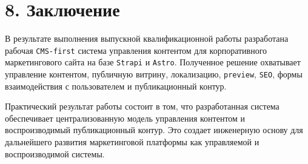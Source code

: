 \documentclass[12pt,a4paper]{article}
\begin{document}
\section*{8. Заключение}

В результате выполнения выпускной квалификационной работы разработана рабочая
\texttt{CMS-first} система управления контентом для корпоративного маркетингового сайта на
базе \texttt{Strapi} и \texttt{Astro}. Полученное решение охватывает управление контентом,
публичную витрину, локализацию, \texttt{preview}, \texttt{SEO}, формы взаимодействия с
пользователем и публикационный контур.

Практический результат работы состоит в том, что разработанная система обеспечивает
централизованную модель управления контентом и воспроизводимый публикационный контур.
Это создает инженерную основу для дальнейшего развития маркетинговой платформы как
управляемой и воспроизводимой системы.
\end{document}
